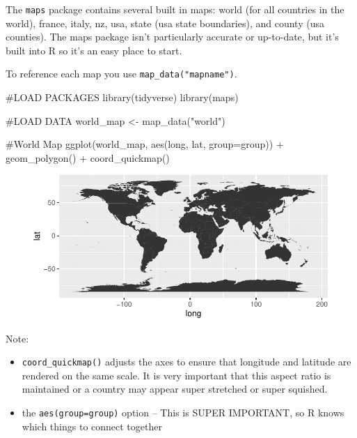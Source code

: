 \documentclass[
  letterpaper,
  DIV=11,
  numbers=noendperiod]{scrartcl}
\newenvironment{Shaded}{\begin{snugshade}}{\end{snugshade}}
\newcommand{\AttributeTok}[1]{\textcolor[rgb]{0.40,0.45,0.13}{#1}}
\newcommand{\CommentTok}[1]{\textcolor[rgb]{0.37,0.37,0.37}{#1}}
\newcommand{\FunctionTok}[1]{\textcolor[rgb]{0.28,0.35,0.67}{#1}}
\newcommand{\NormalTok}[1]{\textcolor[rgb]{0.00,0.23,0.31}{#1}}
\newcommand{\OtherTok}[1]{\textcolor[rgb]{0.00,0.23,0.31}{#1}}
\newcommand{\SpecialCharTok}[1]{\textcolor[rgb]{0.37,0.37,0.37}{#1}}
\newcommand{\StringTok}[1]{\textcolor[rgb]{0.13,0.47,0.30}{#1}}
\providecommand{\tightlist}{%
  \setlength{\itemsep}{0pt}\setlength{\parskip}{0pt}}\usepackage{longtable,booktabs,array}
\begin{document}
The \texttt{maps} package contains several built in maps: world (for all
countries in the world), france, italy, nz, usa, state (usa state
boundaries), and county (usa counties). The maps package isn't
particularly accurate or up-to-date, but it's built into R so it's an
easy place to start.

To reference each map you use \texttt{map\_data("mapname")}.

\begin{Shaded}
\begin{Highlighting}[]
\CommentTok{\#LOAD PACKAGES}
\FunctionTok{library}\NormalTok{(tidyverse)}
\FunctionTok{library}\NormalTok{(maps)}

\CommentTok{\#LOAD DATA}
\NormalTok{world\_map }\OtherTok{\textless{}{-}} \FunctionTok{map\_data}\NormalTok{(}\StringTok{"world"}\NormalTok{)}
\end{Highlighting}
\end{Shaded}

\begin{Shaded}
\begin{Highlighting}[]
\CommentTok{\#World Map}
\FunctionTok{ggplot}\NormalTok{(world\_map, }\FunctionTok{aes}\NormalTok{(long, lat, }\AttributeTok{group=}\NormalTok{group)) }\SpecialCharTok{+} 
  \FunctionTok{geom\_polygon}\NormalTok{() }\SpecialCharTok{+}
  \FunctionTok{coord\_quickmap}\NormalTok{()}
\end{Highlighting}
\end{Shaded}

\begin{figure}[H]

{\centering \includegraphics{118_K_maps1_files/figure-pdf/unnamed-chunk-2-1.pdf}

}

\end{figure}

Note:

\begin{itemize}
\tightlist
\item
  \texttt{coord\_quickmap()} adjusts the axes to ensure that longitude
  and latitude are rendered on the same scale. It is very important that
  this aspect ratio is maintained or a country may appear super
  stretched or super squished.
\item
  the \texttt{aes(group=group)} option -- This is SUPER IMPORTANT, so R
  knows which things to connect together
\end{itemize}
\end{document}
